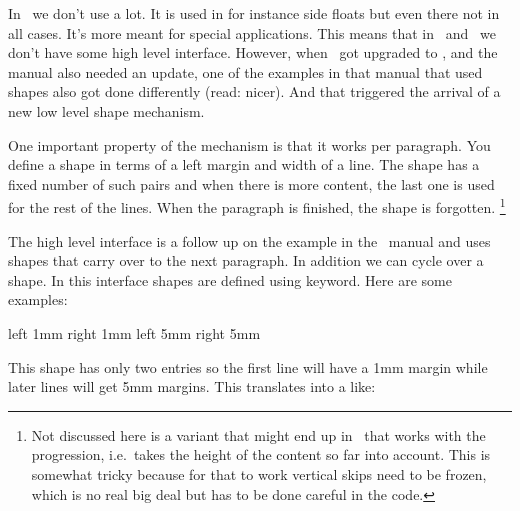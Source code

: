 \startplacefigure[title=Hanging indentation,reference=fig:hang]
\startcombination[nx=2,ny=2]
    {\typesetbuffer[demo-5][page=1,width=.4\textwidth,frame=on]} {\type{\hangafter +4 \hangindent +4cm}}
    {\typesetbuffer[demo-5][page=2,width=.4\textwidth,frame=on]} {\type{\hangafter -4 \hangindent +4cm}}
    {\typesetbuffer[demo-5][page=3,width=.4\textwidth,frame=on]} {\type{\hangafter +4 \hangindent -4cm}}
    {\typesetbuffer[demo-5][page=4,width=.4\textwidth,frame=on]} {\type{\hangafter -4 \hangindent -4cm}}
\stopcombination
\stopplacefigure

\stopsection

\startsection[title=Shapes]

In \CONTEXT\ we don't use \type {\parshape} a lot. It is used in for instance
side floats but even there not in all cases. It's more meant for special
applications. This means that in \MKII\ and \MKIV\ we don't have some high level
interface. However, when \METAFUN\ got upgraded to \LUAMETAFUN, and the manual
also needed an update, one of the examples in that manual that used shapes also
got done differently (read: nicer). And that triggered the arrival of a new low
level shape mechanism.

One important property of the \type {\parshape} mechanism is that it works per
paragraph. You define a shape in terms of a left margin and width of a line. The
shape has a fixed number of such pairs and when there is more content, the last
one is used for the rest of the lines. When the paragraph is finished, the shape
is forgotten. \footnote {Not discussed here is a variant that might end up in
\LUAMETATEX\ that works with the progression, i.e.\ takes the height of the
content so far into account. This is somewhat tricky because for that to work
vertical skips need to be frozen, which is no real big deal but has to be done
careful in the code.}

The high level interface is a follow up on the example in the \METAFUN\ manual and
uses shapes that carry over to the next paragraph. In addition we can cycle over
a shape. In this interface shapes are defined using keyword. Here are some
examples:

\starttyping[option=TEX]
\startparagraphshape[test]
    left 1mm right 1mm
    left 5mm right 5mm
\stopparagraphshape
\stoptyping

This shape has only two entries so the first line will have a 1mm margin while
later lines will get 5mm margins. This translates into a \type {\parshape} like:

